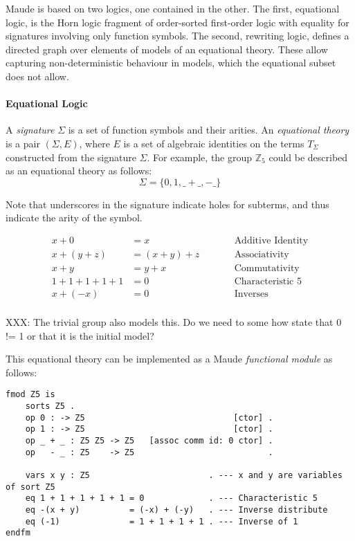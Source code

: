 \documentclass[]{article}
\let\oldparagraph\paragraph
\renewcommand{\paragraph}[1]{\oldparagraph{#1}\mbox{}}
\newcommand \Z        {\mathbb Z}
\newcommand \terms    {T_{\Sigma}}
\begin{document}
Maude is based on two logics, one contained in the other. The first,
equational logic, is the Horn logic fragment of order-sorted first-order
logic with equality for signatures involving only function symbols. The
second, rewriting logic, defines a directed graph over elements of
models of an equational theory. These allow capturing non-deterministic
behaviour in models, which the equational subset does not allow.

\hypertarget{equational-logic}{%
\paragraph{Equational Logic}\label{equational-logic}}

A \emph{signature} \(\Sigma\) is a set of function symbols and their
arities. An \emph{equational theory} is a pair \((\Sigma, E)\), where
\(E\) is a set of algebraic identities on the terms \(\terms\)
constructed from the signature \(\Sigma\). For example, the group
\(\Z_5\) could be described as an equational theory as follows:
\[\Sigma = \{ 0, 1, \_+\_, -\_ \}\]

Note that underscores in the signature indicate holes for subterms, and
thus indicate the arity of the symbol.

\[\begin{aligned}
x + 0                     &= x                     &\quad\quad& \text{Additive Identity}   \\
x + (y + z)               &= (x + y) + z           &\quad\quad& \text{Associativity}       \\
x + y                     &= y + x                 &\quad\quad& \text{Commutativity}       \\
1 +  1 +  1 +  1 + 1      &= 0                     &\quad\quad& \text{Characteristic 5}    \\
x + (-x)                  &= 0                     &\quad\quad& \text{Inverses}            \\
\end{aligned}\]

XXX: The trivial group also models this. Do we need to some how state
that 0 != 1 or that it is the initial model?

This equational theory can be implemented as a Maude \emph{functional
module} as follows:

\begin{verbatim}
fmod Z5 is
    sorts Z5 .
    op 0 : -> Z5                              [ctor] .
    op 1 : -> Z5                              [ctor] .
    op _ + _ : Z5 Z5 -> Z5   [assoc comm id: 0 ctor] .
    op   - _ : Z5    -> Z5                           .

    vars x y : Z5                        . --- x and y are variables of sort Z5
    eq 1 + 1 + 1 + 1 + 1 = 0             . --- Characteristic 5
    eq -(x + y)          = (-x) + (-y)   . --- Inverse distribute
    eq (-1)              = 1 + 1 + 1 + 1 . --- Inverse of 1
endfm
\end{verbatim}
\end{document}
